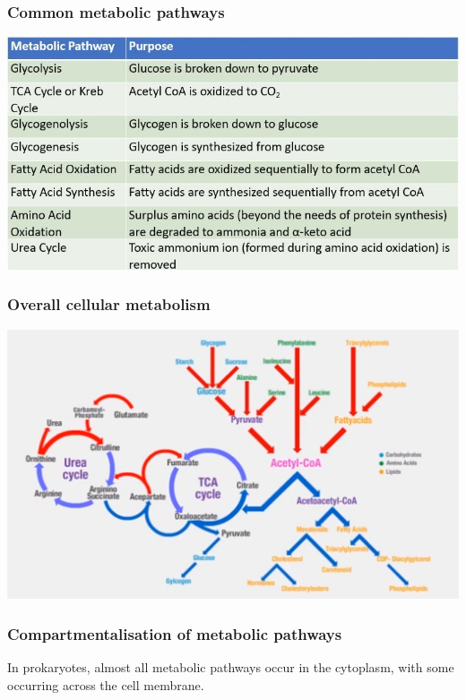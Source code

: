 \documentclass[11pt]{article}
\begin{document}
\subsubsection{Common metabolic pathways}
\label{sec:orgfb2c6d3}
\begin{center}
\includegraphics[width=.9\linewidth]{./images/metabolic-pathways.jpg}
\end{center}

\subsubsection{Overall cellular metabolism}
\label{sec:org3ed75fa}
\begin{center}
\includegraphics[width=.9\linewidth]{./images/overall-cellular-metabolism.png}
\end{center}

\newpage

\subsubsection{Compartmentalisation of metabolic pathways}
\label{sec:org20b4ade}
In prokaryotes, almost all metabolic pathways occur in the cytoplasm, with some occurring across the cell membrane.
\\[0pt]
\end{document}
